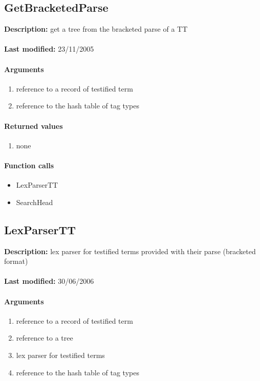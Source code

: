 \subsection{GetBracketedParse}
\textbf{Description:} get a tree from the bracketed parse of a TT\\
\\\textbf{Last modified:} 23/11/2005

\paragraph{Arguments}
\begin{enumerate}
\item reference to a record of testified term
\item reference to the hash table of tag types
\end{enumerate}

\paragraph{Returned values}
\begin{enumerate}
\item none
\end{enumerate}

\paragraph{Function calls}
\begin{itemize}
\item LexParserTT
\item SearchHead
\end{itemize}

\subsection{LexParserTT}
\textbf{Description:} lex parser for testified terms provided with their parse (bracketed format)\\
\\\textbf{Last modified:} 30/06/2006

\paragraph{Arguments}
\begin{enumerate}
\item reference to a record of testified term
\item reference to a tree
\item lex parser for testified terms
\item reference to the hash table of tag types
\end{enumerate}

